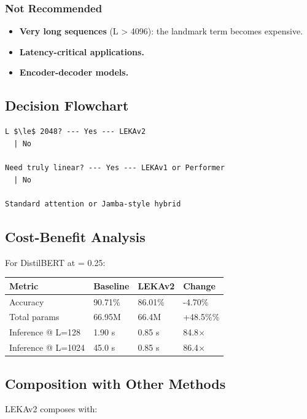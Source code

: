 \subsubsection{Not Recommended}
\begin{itemize}
\item \textbf{Very long sequences} (L \textgreater{} 4096): the landmark term becomes expensive.
\item \textbf{Latency-critical applications.}
\item \textbf{Encoder-decoder models.}

\end{itemize}
\subsection{Decision Flowchart}

\begin{lstlisting}
L $\le$ 2048? --- Yes --- LEKAv2
  | No
   
Need truly linear? --- Yes --- LEKAv1 or Performer
  | No
   
Standard attention or Jamba-style hybrid
\end{lstlisting}

\subsection{Cost-Benefit Analysis}

For DistilBERT at   = 0.25:

\begin{table}[H]
\centering
\small
\begin{tabular}{llll}
\toprule
\textbf{Metric} & \textbf{Baseline} & \textbf{LEKAv2} & \textbf{Change} \\
\midrule
Accuracy & 90.71\% & 86.01\% & -4.70\% \\
Total params & 66.95M & 66.4M & +48.5\%\% \\
Inference @ L=128 & 1.90 s & 0.85 s & 84.8$\times$ \\
Inference @ L=1024 & 45.0 s & 0.85 s & 86.4$\times$ \\
\bottomrule
\end{tabular}
\end{table}

\subsection{Composition with Other Methods}

LEKAv2 composes with:

